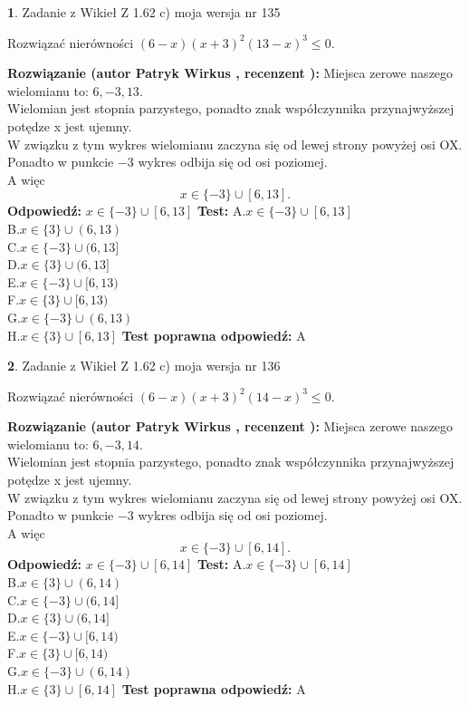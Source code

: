 \documentclass[12pt, a4paper]{article}
\theoremstyle{definition} %
\newtheorem{zad}{}
\newcommand{\zadStart}[1]{\begin{zad}#1\newline}
\newcommand{\zadStop}{\end{zad}}
\newcommand{\rozwStart}[2]{\noindent \textbf{Rozwiązanie (autor #1 , recenzent #2): }\newline}
\newcommand{\rozwStop}{\newline}
\newcommand{\odpStart}{\noindent \textbf{Odpowiedź:}\newline}
\newcommand{\odpStop}{\newline}
\newcommand{\testStart}{\noindent \textbf{Test:}\newline}
\newcommand{\testStop}{\newline}
\newcommand{\kluczStart}{\noindent \textbf{Test poprawna odpowiedź:}\newline}
\newcommand{\kluczStop}{\newline}
\begin{document}
\zadStart{Zadanie z Wikieł Z 1.62 c) moja wersja nr 135}

Rozwiązać nierówności $(6-x)(x+3)^{2}(13-x)^{3}\le0$.
\zadStop
\rozwStart{Patryk Wirkus}{}
Miejsca zerowe naszego wielomianu to: $6, -3, 13$.\\
Wielomian jest stopnia parzystego, ponadto znak współczynnika przy\linebreak najwyższej potędze x jest ujemny.\\ W związku z tym wykres wielomianu zaczyna się od lewej strony powyżej osi OX.\\
Ponadto w punkcie $-3$ wykres odbija się od osi poziomej.\\
A więc $$x \in \{-3\} \cup [6,13].$$
\rozwStop
\odpStart
$x \in \{-3\} \cup [6,13]$
\odpStop
\testStart
A.$x \in \{-3\} \cup [6,13]$\\
B.$x \in \{3\} \cup (6,13)$\\
C.$x \in \{-3\} \cup (6,13]$\\
D.$x \in \{3\} \cup (6,13]$\\
E.$x \in \{-3\} \cup [6,13)$\\
F.$x \in \{3\} \cup [6,13)$\\
G.$x \in \{-3\} \cup (6,13)$\\
H.$x \in \{3\} \cup [6,13]$
\testStop
\kluczStart
A
\kluczStop



\zadStart{Zadanie z Wikieł Z 1.62 c) moja wersja nr 136}

Rozwiązać nierówności $(6-x)(x+3)^{2}(14-x)^{3}\le0$.
\zadStop
\rozwStart{Patryk Wirkus}{}
Miejsca zerowe naszego wielomianu to: $6, -3, 14$.\\
Wielomian jest stopnia parzystego, ponadto znak współczynnika przy\linebreak najwyższej potędze x jest ujemny.\\ W związku z tym wykres wielomianu zaczyna się od lewej strony powyżej osi OX.\\
Ponadto w punkcie $-3$ wykres odbija się od osi poziomej.\\
A więc $$x \in \{-3\} \cup [6,14].$$
\rozwStop
\odpStart
$x \in \{-3\} \cup [6,14]$
\odpStop
\testStart
A.$x \in \{-3\} \cup [6,14]$\\
B.$x \in \{3\} \cup (6,14)$\\
C.$x \in \{-3\} \cup (6,14]$\\
D.$x \in \{3\} \cup (6,14]$\\
E.$x \in \{-3\} \cup [6,14)$\\
F.$x \in \{3\} \cup [6,14)$\\
G.$x \in \{-3\} \cup (6,14)$\\
H.$x \in \{3\} \cup [6,14]$
\testStop
\kluczStart
A
\kluczStop
\end{document}
